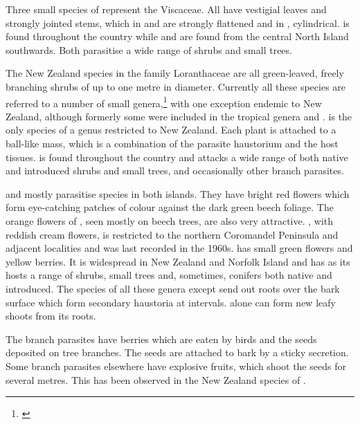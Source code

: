 Three small species of  represent the Viscaceae.
All have vestigial leaves and strongly jointed stems, which in  and  are strongly flattened and in , cylindrical.  is found throughout the country while  and  are found from the central North Island southwards.
Both parasitise a wide range of shrubs and small trees.

The New Zealand species in the family Loranthaceae are all green-leaved, freely branching shrubs of up to one metre in diameter.
Currently all these species are referred to a number of small genera,\footnote{\cite{barlow1966revision}} with one exception endemic to New Zealand, although formerly some were included in the tropical genera  and .   is the only species of a genus restricted to New Zealand.
Each plant is attached to a ball-like mass, which is a combination of the parasite haustorium and the host tissues.  is found throughout the country and attacks a wide range of both native and introduced shrubs and small trees, and occasionally other branch parasites.

 and  mostly parasitise  species in both islands.
They have bright red flowers which form eye-catching patches of colour against the dark green beech foliage.
The orange flowers of , seen mostly on beech trees, are also very attractive. , with reddish cream flowers, is restricted to the northern Coromandel Peninsula and adjacent localities and was last recorded in the 1960s.  has small green flowers and yellow berries.
It is widespread in New Zealand and Norfolk Island and has as its hosts a range of shrubs, small trees and, sometimes, conifers both native and introduced.
The species of all these genera except  send out roots over the bark surface which form secondary haustoria at intervals.  alone can form new leafy shoots from its roots.

The branch parasites have berries which are eaten by birds and the seeds deposited on tree branches.
The seeds are attached to bark by a sticky secretion.
Some branch parasites elsewhere have explosive fruits, which shoot the seeds for several metres.
This has been observed in the New Zealand species of .

